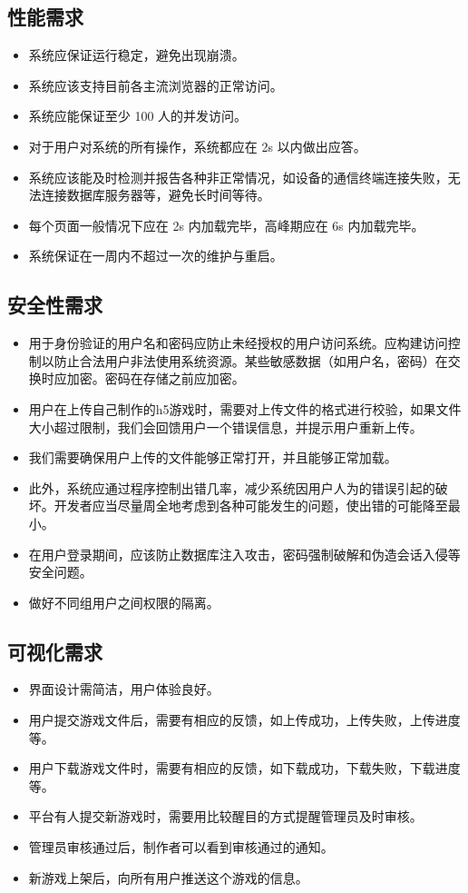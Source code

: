 \documentclass[12pt]{ctexart} %
\begin{document}
\subsection{性能需求}

\begin{itemize}
    \item 系统应保证运行稳定，避免出现崩溃。
    \item 系统应该支持目前各主流浏览器的正常访问。
    \item 系统应能保证至少 100 人的并发访问。
    \item 对于用户对系统的所有操作，系统都应在 2s 以内做出应答。
    \item 系统应该能及时检测并报告各种非正常情况，如设备的通信终端连接失败，无法连接数据库服务器等，避免长时间等待。
    \item 每个页面一般情况下应在 2s 内加载完毕，高峰期应在 6s 内加载完毕。
    \item 系统保证在一周内不超过一次的维护与重启。
\end{itemize}

\subsection{安全性需求}
\begin{itemize}
  \item 用于身份验证的用户名和密码应防止未经授权的用户访问系统。应构建访问控制以防止合法用户非法使用系统资源。某些敏感数据（如用户名，密码）在交换时应加密。密码在存储之前应加密。
  \item 用户在上传自己制作的h5游戏时，需要对上传文件的格式进行校验，如果文件大小超过限制，我们会回馈用户一个错误信息，并提示用户重新上传。
  \item 我们需要确保用户上传的文件能够正常打开，并且能够正常加载。
  \item 此外，系统应通过程序控制出错几率，减少系统因用户人为的错误引起的破坏。开发者应当尽量周全地考虑到各种可能发生的问题，使出错的可能降至最小。
  \item 在用户登录期间，应该防止数据库注入攻击，密码强制破解和伪造会话入侵等安全问题。
  \item 做好不同组用户之间权限的隔离。
\end{itemize}

\subsection{可视化需求}
\begin{itemize}
  \item 界面设计需简洁，用户体验良好。
  \item 用户提交游戏文件后，需要有相应的反馈，如上传成功，上传失败，上传进度等。
  \item 用户下载游戏文件时，需要有相应的反馈，如下载成功，下载失败，下载进度等。
  \item 平台有人提交新游戏时，需要用比较醒目的方式提醒管理员及时审核。
  \item 管理员审核通过后，制作者可以看到审核通过的通知。
  \item 新游戏上架后，向所有用户推送这个游戏的信息。
\end{itemize}
\end{document}
